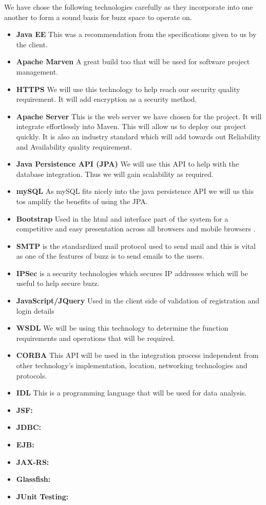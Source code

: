 We have chose the following technologies carefully as they incorporate into one another to form a sound basis for buzz space to operate on.

\begin{itemize}
	\item \textbf{Java EE}
		This was a recommendation from the specifications given to us by the client.
	\item \textbf{Apache Marven}
		A great build too that will be used for software project management.
	\item \textbf{HTTPS}
		We will use this technology to help reach our security quality requirement. It will add encryption as a security method.
	\item \textbf{Apache Server}
		This is the web server we have chosen for the project. It will integrate effortlessly into Maven. This will allow us to deploy our project quickly. It is also an industry standard which will add towards out Reliability and Availability quality requirement. 
	\item \textbf{Java Persistence API (JPA) }
		We will use this API to help with the database integration. Thus we will gain scalability as required.
	\item \textbf{mySQL}
		As mySQL fits nicely into the java persistence API we will us this tos amplify the benefits of using the JPA.
		
		\item \textbf{Bootstrap}
		Used in the html and interface part of the system for a competitive and easy presentation across all browsers 	and mobile browsers .
		\item \textbf{SMTP} is the standardized mail protocol used to send mail and this is vital as one of the features of buzz is to send emails to the users.
		\item \textbf{IPSec} is a security technologies which secures IP addresses which will be useful to help secure buzz.
	\item \textbf{JavaScript/JQuery}
		Used in the client side of validation of registration and login details
	\item \textbf{WSDL} 
		We will be using this technology to determine the function requirements and operations that will be required.
	\item \textbf{CORBA}
		This API will be used in the integration process independent from other technology's implementation, location, networking 		technologies and protocols.
	\item \textbf{IDL}
		This is a programming language that will be used for data analysis. 
			\item \textbf{JSF:}
			\item \textbf{JDBC:}
			\item \textbf{EJB:}
			\item \textbf{JAX-RS:}
			\item \textbf{Glassfish:}
			\item \textbf{JUnit Testing:}
		
\end{itemize}